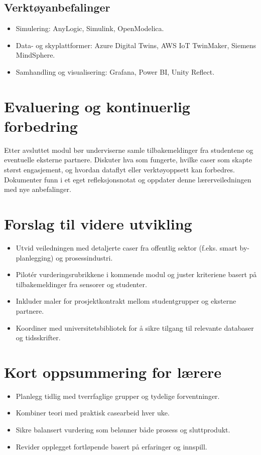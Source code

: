 \subsection{Verktøyanbefalinger}
\begin{itemize}
    \item Simulering: AnyLogic, Simulink, OpenModelica.
    \item Data- og skyplattformer: Azure Digital Twins, AWS IoT TwinMaker, Siemens MindSphere.
    \item Samhandling og visualisering: Grafana, Power BI, Unity Reflect.
\end{itemize}

\section{Evaluering og kontinuerlig forbedring}
Etter avsluttet modul bør underviserne samle tilbakemeldinger fra studentene og eventuelle eksterne partnere. Diskuter hva som fungerte, hvilke caser som skapte størst engasjement, og hvordan dataflyt eller verktøyoppsett kan forbedres. Dokumenter funn i et eget refleksjonsnotat og oppdater denne lærerveiledningen med nye anbefalinger.

\section{Forslag til videre utvikling}
\begin{itemize}
    \item Utvid veiledningen med detaljerte caser fra offentlig sektor (f.eks. smart by-planlegging) og prosessindustri.
    \item Pilotér vurderingsrubrikkene i kommende modul og juster kriteriene basert på tilbakemeldinger fra sensorer og studenter.
    \item Inkluder maler for prosjektkontrakt mellom studentgrupper og eksterne partnere.
    \item Koordiner med universitetsbibliotek for å sikre tilgang til relevante databaser og tidsskrifter.
\end{itemize}

\section{Kort oppsummering for lærere}
\begin{itemize}
    \item Planlegg tidlig med tverrfaglige grupper og tydelige forventninger.
    \item Kombiner teori med praktisk casearbeid hver uke.
    \item Sikre balansert vurdering som belønner både prosess og sluttprodukt.
    \item Revider opplegget fortløpende basert på erfaringer og innspill.
\end{itemize}


